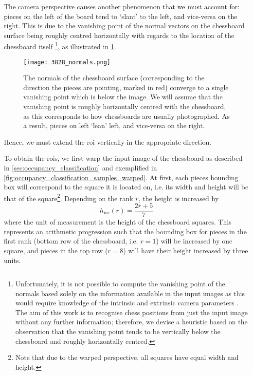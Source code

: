 \documentclass[../main.tex]{subfiles}
\begin{document}
The camera perspective causes another phenomenon that we must account for: pieces on the left of the board tend to `slant' to the left, and vice-versa on the right.
This is due to the vanishing point of the normal vectors on the chessboard surface being roughly centred horizontally with regards to the location of the chessboard itself%
\footnote{%
    Unfortunately, it is not possible to compute the vanishing point of the normals based solely on the information available in the input images as this would require knowledge of the intrinsic and extrinsic camera parameters \cite{hartley2004}.
    The aim of this work is to recognise chess positions from just the input image without any further information; therefore, we devise a heuristic based on the observation that the vanishing point tends to be vertically below the chessboard and roughly horizontally centred.
}, as illustrated in \cref{fig:occupancy_classification_normals}.
\begin{figure}
    \centering
    \texttt{[image: 3828\_normals.png]}
    \caption[The normals of the chessboard surface converge to a single vanishing point which is below the image.]{The normals of the chessboard surface (corresponding to the direction the pieces are pointing, marked in red) converge to a single vanishing point which is below the image. We will assume that the vanishing point is roughly horizontally centred with the chessboard, as this corresponds to how chessboards are usually photographed. As a result, pieces on left `lean' left, and vice-versa on the right.}
    \label{fig:occupancy_classification_normals}
\end{figure}
Hence, we must extend the \gls{roi} vertically in the appropriate direction.

To obtain the \glspl{roi}, we first warp the input image of the chessboard as described in \cref{sec:occupancy_classification} and exemplified in \cref{fig:occupancy_classification_samples_warped}.
At first, each pieces bounding box will correspond to the square it is located on, i.e. its width and height will be that of the square\footnote{Note that due to the warped perspective, all squares have equal width and height.}.
Depending on the rank $r$, the height is increased by
\begin{equation*}
    h_\text{inc}(r) = \frac{2r + 5}{7}
\end{equation*}
where the unit of measurement is the height of the chessboard squares.
This represents an arithmetic progression such that the bounding box for pieces in the first rank (bottom row of the chessboard, i.e. $r=1$) will be increased by one square, and pieces in the top row ($r=8$) will have their height increased by three units.
\end{document}
